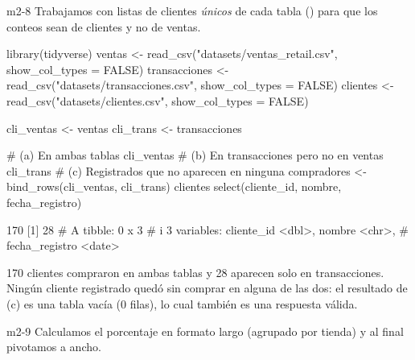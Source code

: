 \begin{solucion}{m2-8}
Trabajamos con listas de clientes \emph{únicos} de cada tabla
() para que los conteos sean de clientes y no de ventas.
\end{solucion}

\begin{rcode}
library(tidyverse)
ventas <- read_csv("datasets/ventas_retail.csv", show_col_types = FALSE)
transacciones <- read_csv("datasets/transacciones.csv",
                          show_col_types = FALSE)
clientes <- read_csv("datasets/clientes.csv", show_col_types = FALSE)

cli_ventas <- ventas %
cli_trans  <- transacciones %

# (a) En ambas tablas
cli_ventas %
# (b) En transacciones pero no en ventas
cli_trans %
# (c) Registrados que no aparecen en ninguna
compradores <- bind_rows(cli_ventas, cli_trans) %
clientes %
  select(cliente_id, nombre, fecha_registro)
\end{rcode}
\begin{rsalida}
[1] 170
[1] 28
# A tibble: 0 x 3
# i 3 variables: cliente_id <dbl>, nombre <chr>,
#   fecha_registro <date>
\end{rsalida}

170 clientes compraron en ambas tablas y 28 aparecen solo en
transacciones. Ningún cliente registrado quedó sin comprar en alguna de las
dos: el resultado de (c) es una tabla vacía (0 filas), lo cual también es
una respuesta válida.


\begin{solucion}{m2-9}
Calculamos el porcentaje en formato largo (agrupado por tienda) y al final
pivotamos a ancho.
\end{solucion}


